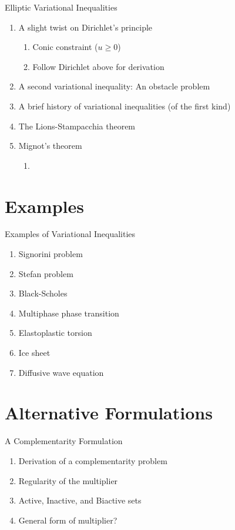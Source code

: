 \documentclass[aspectratio=169,xcolor=dvipsnames,11pt]{beamer}
\begin{document}
\begin{frame}{Elliptic Variational Inequalities}
        \begin{enumerate}
        \item A slight twist on Dirichlet's principle
            \begin{enumerate}
                \item Conic constraint ($u \ge 0$)
                \item Follow Dirichlet above for derivation
            \end{enumerate}
        \item A second variational inequality: An obstacle problem
        \item A brief history of variational inequalities (of the first kind)
        \item The Lions-Stampacchia theorem
        \item Mignot's theorem
            \begin{enumerate}
                \item 
            \end{enumerate}
    \end{enumerate}
\end{frame}
\section{Examples}\label{sec:examples}
\begin{frame}{Examples of Variational Inequalities}
    \begin{enumerate}
        \item Signorini problem
        \item Stefan problem
        \item Black-Scholes
        \item Multiphase phase transition
        \item Elastoplastic torsion
        \item Ice sheet
        \item Diffusive wave equation
    \end{enumerate}
\end{frame}
\section{Alternative Formulations}\label{sec:complementarity}
\begin{frame}{A Complementarity Formulation}
        \begin{enumerate}
        \item Derivation of a complementarity problem
        \item Regularity of the multiplier
        \item Active, Inactive, and Biactive sets
        \item General form of multiplier?
    \end{enumerate}
\end{frame}
\end{document}
